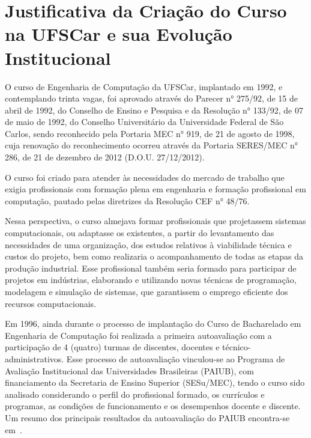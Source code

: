 \section{Justificativa da Criação do Curso na UFSCar e sua Evolução Institucional}


O curso de Engenharia de Computação da UFSCar, implantado em 1992, e contemplando trinta vagas, foi aprovado através do Parecer n° 275/92, de 15 de abril de 1992, do Conselho de Ensino e Pesquisa e da Resolução n° 133/92, de 07 de maio de 1992, do Conselho Universitário da Universidade Federal de São Carlos, sendo reconhecido pela Portaria MEC n° 919, de 21 de agosto de 1998, cuja renovação do reconhecimento ocorreu através da Portaria SERES/MEC n° 286, de 21 de dezembro de 2012 (D.O.U. 27/12/2012).

O curso foi criado para atender às necessidades do mercado de trabalho que exigia profissionais com formação plena em engenharia e formação profissional em computação, pautado pelas diretrizes da Resolução CEF n° 48/76.

Nessa perspectiva, o curso almejava formar profissionais que projetassem sistemas computacionais, ou adaptasse os existentes, a partir do levantamento das necessidades de uma organização, dos estudos relativos à viabilidade técnica e custos do projeto, bem como realizaria o acompanhamento de todas as etapas da produção industrial. Esse profissional também seria formado para participar de projetos em indústrias, elaborando e utilizando novas técnicas de programação, modelagem e simulação de sistemas, que garantissem o emprego eficiente dos recursos computacionais.


Em 1996, ainda durante o processo de implantação do Curso de Bacharelado em Engenharia de Computação foi realizada a primeira autoavaliação com a participação de 4 (quatro) turmas de discentes, docentes e técnico-administrativos. Esse processo de autoavaliação vinculou-se ao Programa de Avaliação Institucional das Universidades Brasileiras (PAIUB), com financiamento da Secretaria de Ensino Superior (SESu/MEC), tendo o curso sido analisado considerando o perfil do profissional formado, os currículos e programas, as condições de funcionamento e os desempenhos docente e discente. Um resumo dos principais resultados da autoavaliação do PAIUB encontra-se em~\textcite{CPA}.

